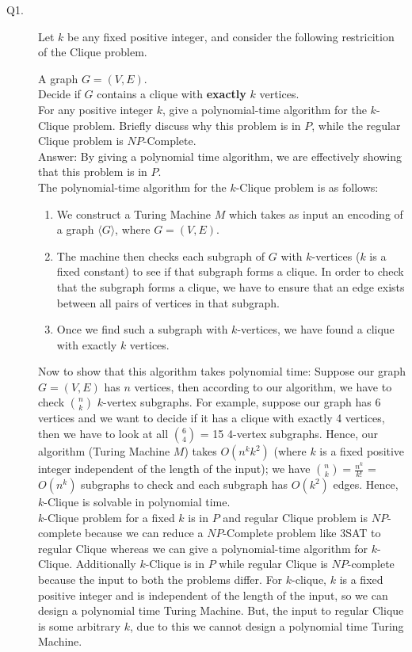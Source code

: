 \documentclass{csc_assignment}
\begin{document}
\begin{description}

\newpage
\item[Q1.]
Let $k$ be any fixed positive integer, and consider the following restricition of the Clique problem.

A graph $G = (V, E)$. \\
Decide if $G$ contains a clique with {\bf exactly} $k$ vertices.\\
For any positive integer $k$, give a polynomial-time algorithm for the $k$-Clique problem.
Briefly discuss why this problem is in $P$, while the regular Clique problem is $NP$-Complete.
\\
 
Answer: By giving a polynomial time algorithm, we are effectively showing that this problem is in $P$. \\ The polynomial-time algorithm for the $k$-Clique problem is as follows:\\ \begin{enumerate}
\item We construct a Turing Machine $M$ which takes as input an encoding of a graph $\langle G \rangle$, where $G = (V, E)$. 
\item The machine then checks each subgraph of $G$ with $k$-vertices ($k$ is a fixed constant) to see if that subgraph forms a clique. In order to check that the subgraph forms a clique, we have to ensure that an edge exists between all pairs of vertices in that subgraph.
\item Once we find such a subgraph with $k$-vertices, we have found a clique with exactly $k$ vertices. 
\end{enumerate}
Now to show that this algorithm takes polynomial time: Suppose our graph $G = (V, E)$ has $n$ vertices, then according to our algorithm, we have to check ${n \choose k}$ $k$-vertex subgraphs. For example, suppose our graph has 6 vertices and we want to decide if it has a clique with exactly 4 vertices, then we have to look at all ${6 \choose 4}$ = 15 4-vertex subgraphs. Hence, our algorithm (Turing Machine $M$) takes $O(n^{k}k^{2})$ (where $k$ is a fixed positive integer independent of the length of the input); we have $\binom{n}{k} = \frac{n^{k}}{k!}$ = $O(n^{k})$ subgraphs to check and each subgraph has $O(k^{2})$ edges. Hence, $k$-Clique is solvable in polynomial time. \\[5pt] $k$-Clique problem for a fixed $k$ is in $P$ and regular Clique problem is $NP$-complete because we can reduce a $NP$-Complete problem like 3SAT to regular Clique whereas we can give a polynomial-time algorithm for $k$-Clique. Additionally $k$-Clique is in $P$ while regular Clique is $NP$-complete because the input to both the problems differ. For $k$-clique, $k$ is a fixed positive integer and is independent of the length of the input, so we can design a polynomial time Turing Machine. But, the input to regular Clique is some arbitrary $k$, due to this we cannot design a polynomial time Turing Machine. 

\end{description}
\end{document}
